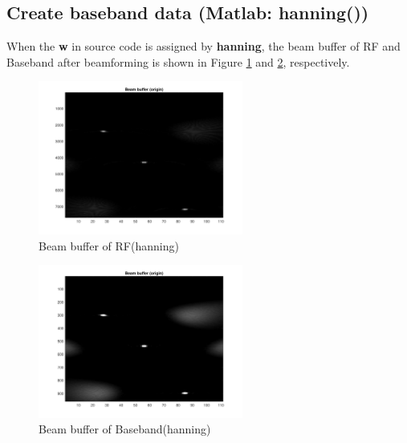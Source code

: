 \documentclass{article}
\begin{document}
\subsection{Create baseband data (Matlab: hanning())}
When the \textbf{w} in source code is assigned by \textbf{hanning}, the beam buffer of RF and Baseband after beamforming is shown in
Figure \ref{fig:RF-hanning} and \ref{fig:Base-hanning}, respectively.
\begin{figure}[H]
    \centering
    \includegraphics[width=0.6\textwidth]{src/RF/b-3-hanning.pdf}
    \caption{Beam buffer of RF(hanning)}
    \label{fig:RF-hanning}
\end{figure}
\begin{figure}[H]
    \centering
    \includegraphics[width=0.6\textwidth]{src/Base/b-4-hanning.pdf}
    \caption{Beam buffer of Baseband(hanning)}
    \label{fig:Base-hanning}
\end{figure}
\end{document}
